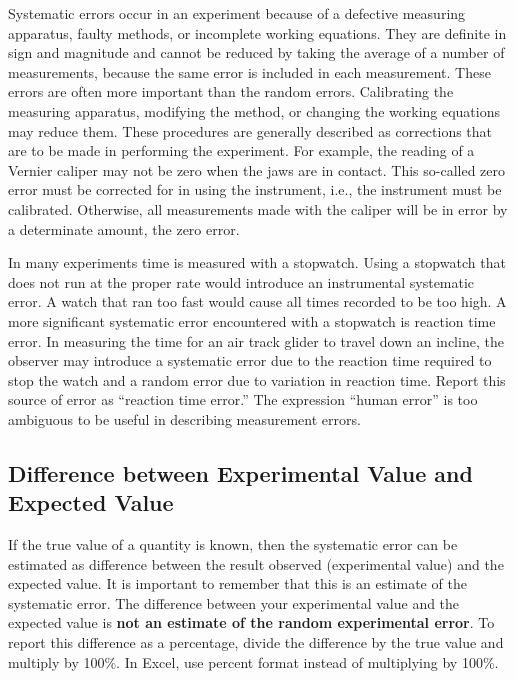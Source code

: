 Systematic errors occur in an experiment because of a defective measuring apparatus, faulty methods, or incomplete working equations. They are definite in sign and magnitude and cannot be reduced by taking the average of a number of measurements, because the same error is included in each measurement.
These errors are often more important than the random errors. Calibrating the measuring apparatus, modifying the method, or changing the working equations may reduce them. These procedures are generally described as corrections that are to be made in performing the experiment.
For example, the reading of a Vernier caliper may not be zero when the jaws are in contact. This so-called zero error must be corrected for in using the instrument, i.e., the instrument must be calibrated. Otherwise, all measurements made with the caliper will be in error by a determinate amount, the zero error.

In many experiments time is measured with a stopwatch. Using a stopwatch that does not run at the proper rate would introduce an instrumental systematic error. A watch that ran too fast would cause all times recorded to be too high. A more significant systematic error encountered with a stopwatch is reaction time error. In measuring the time for an air track glider to travel down an incline, the observer may introduce a systematic error due to the reaction time required to stop the watch and a random error due to variation in reaction time. Report this source of error as ``reaction time error.'' The expression ``human error'' is too ambiguous to be useful in describing measurement errors.


\subsection{Difference between Experimental Value and Expected Value}
\label{sub:ExperimentExpected}

If the true value of a quantity is known, then the systematic error can be estimated as difference between the result observed (experimental value) and the expected value. It is important to remember that this is an estimate of the systematic error. The difference between your experimental value and the expected value is \textbf{not an estimate of the random experimental error}. To report this difference as a percentage, divide the difference by the true value and multiply by 100\%. In Excel, use percent format instead of multiplying by 100\%.

